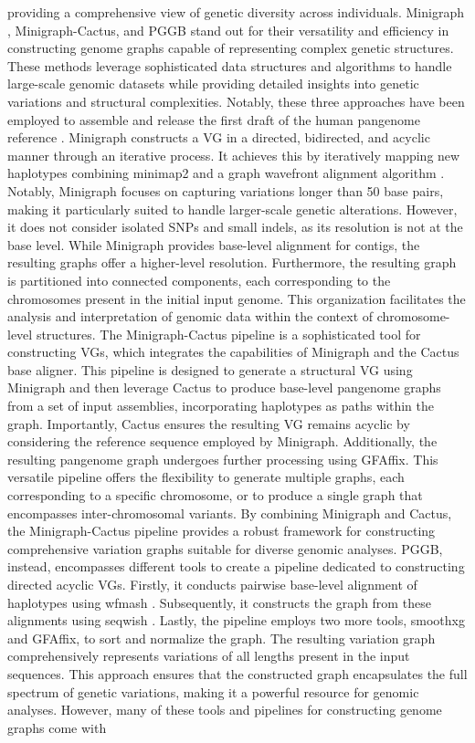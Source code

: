 \documentclass[a4paper, titlepage, openright]{book}
\begin{document}
providing a comprehensive view of genetic diversity across individuals. Minigraph \citep{li2020design}, Minigraph-Cactus, and PGGB \citep{garrison2023building} stand out for their versatility and efficiency in constructing genome graphs capable of representing complex genetic structures. These methods leverage sophisticated data structures and algorithms to handle large-scale genomic datasets while providing detailed insights into genetic variations and structural complexities. Notably, these three approaches have been employed to assemble and release the first draft of the human pangenome reference \citep{liao2023draft}. Minigraph constructs a VG in a directed, bidirected, and acyclic manner through an iterative process. It achieves this by iteratively mapping new haplotypes combining minimap2 \citep{li2018minimap2} and a graph wavefront alignment algorithm \citep{li2020design}. Notably, Minigraph focuses on capturing variations longer than 50 base pairs, making it particularly suited to handle larger-scale genetic alterations. However, it does not consider isolated SNPs and small indels, as its resolution is not at the base level. While Minigraph provides base-level alignment for contigs, the resulting graphs offer a higher-level resolution. Furthermore, the resulting graph is partitioned into connected components, each corresponding to the chromosomes present in the initial input genome. This organization facilitates the analysis and interpretation of genomic data within the context of chromosome-level structures. The Minigraph-Cactus pipeline is a sophisticated tool for constructing VGs, which integrates the capabilities of Minigraph \citep{li2020design} and the Cactus \citep{armstrong2020progressive} base aligner. This pipeline is designed to generate a structural VG using Minigraph and then leverage Cactus to produce base-level pangenome graphs from a set of input assemblies, incorporating haplotypes as paths within the graph. Importantly, Cactus ensures the resulting VG remains acyclic by considering the reference sequence employed by Minigraph. Additionally, the resulting pangenome graph undergoes further processing using GFAffix. This versatile pipeline offers the flexibility to generate multiple graphs, each corresponding to a specific chromosome, or to produce a single graph that encompasses inter-chromosomal variants. By combining Minigraph and Cactus, the Minigraph-Cactus pipeline provides a robust framework for constructing comprehensive variation graphs suitable for diverse genomic analyses. PGGB, instead, encompasses different tools to create a pipeline dedicated to constructing directed acyclic VGs. Firstly, it conducts pairwise base-level alignment of haplotypes using wfmash \citep{garrison2023unbiased}. Subsequently, it constructs the graph from these alignments using seqwish \citep{garrison2023unbiased}. Lastly, the pipeline employs two more tools, smoothxg and GFAffix, to sort and normalize the graph. The resulting variation graph comprehensively represents variations of all lengths present in the input sequences. This approach ensures that the constructed graph encapsulates the full spectrum of genetic variations, making it a powerful resource for genomic analyses. However, many of these tools and pipelines for constructing genome graphs come with 
\end{document}

